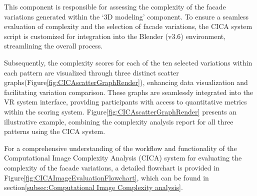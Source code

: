 %    

This component is responsible for assessing the complexity of the facade variations generated within the `3D modeling' component.
To ensure a seamless evaluation of complexity and the selection of facade variations, the CICA system script is customized for integration into the Blender (v3.6) environment, streamlining the overall process.

Subsequently, the complexity scores for each of the ten selected variations within each pattern are visualized through three distinct scatter graphs(Figure\ref{fig:CICAscatterGraphRender}), enhancing data visualization and facilitating variation comparison.
These graphs are seamlessly integrated into the VR system interface, providing participants with access to quantitative metrics within the scoring system.
Figure\ref{fig:CICAscatterGraphRender} presents an illustrative example, combining the complexity analysis report for all three patterns using the CICA system.

For a comprehensive understanding of the workflow and functionality of the Computational Image Complexity Analysis (CICA) system for evaluating the complexity of the facade variations, a detailed flowchart is provided in Figure\ref{fig:CICAImageEvaluationFlowchart}, which can be found in section\ref{subsec:Computational Image Complexity analysis}.

